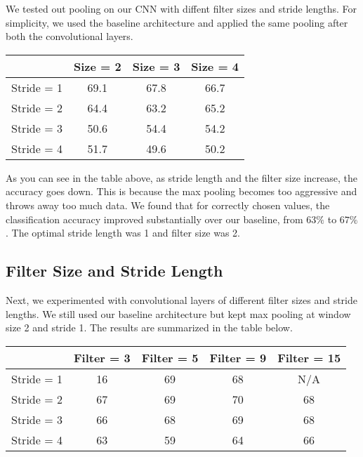 \documentclass[10pt,twoside]{article}
\begin{document}
We tested out pooling on our CNN with diffent filter sizes and stride lengths. For simplicity, we used the baseline architecture and applied the same pooling after both the convolutional layers.

\begin{center}
 \begin{tabular}{||c c c c||} 
 \hline
  & Size = 2 & Size = 3 & Size = 4 \\ [0.5ex] 
 \hline\hline
 Stride = 1 & 69.1 & 67.8 & 66.7 \\ 
 \hline
 Stride = 2 & 64.4 & 63.2 & 65.2 \\
 \hline
 Stride = 3 & 50.6 & 54.4 & 54.2 \\
 \hline
 Stride = 4 & 51.7 & 49.6 & 50.2 \\
 \hline
\end{tabular}
\end{center}

As you can see in the table above, as stride length and the filter size increase, the accuracy goes down. This is because the max pooling becomes too aggressive and throws away too much data. We found that for correctly chosen values, the classification accuracy improved substantially over our baseline, from $63\%$ to $67\%$. The optimal stride length was 1 and filter size was 2.

\subsection{Filter Size and Stride Length}

 Next, we experimented with convolutional layers of different filter sizes and stride lengths. We still used our baseline architecture but kept max pooling at window size 2 and stride 1. The results are summarized in the table below.

\begin{center}
 \begin{tabular}{||c c c c c||} 
 \hline
  & Filter = 3 & Filter = 5 & Filter = 9 & Filter = 15 \\ [0.5ex] 
 \hline\hline
 Stride = 1 & 16 & 69 & 68 & N/A \\ 
 \hline
 Stride = 2 & 67 & 69 & 70 & 68 \\
 \hline
 Stride = 3 & 66 & 68 & 69 & 68 \\
 \hline
 Stride = 4 & 63 & 59 & 64 & 66 \\
 \hline
\end{tabular}
\end{center}
\end{document}
